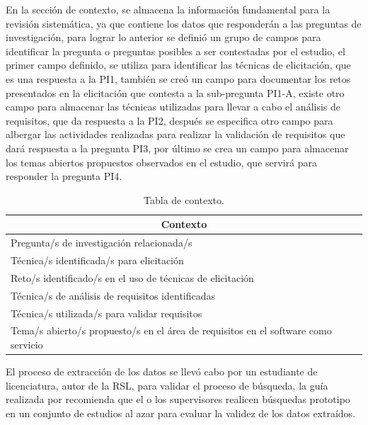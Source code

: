 \documentclass[conference,onecolumn,10pt]{IEEEtran}
\begin{document}
En la sección de contexto, se almacena la información fundamental para la revisión sistemática, ya que contiene los datos que responderán a las
preguntas de investigación, para lograr lo anterior se definió un grupo de campos para identificar la pregunta o preguntas posibles a ser contestadas 
por el estudio, el primer campo definido, se utiliza para identificar las técnicas de elicitación, que es una respuesta a la PI1, también se creó un campo para 
documentar los retos presentados en la elicitación que contesta a la sub-pregunta PI1-A, existe otro campo para almacenar las técnicas utilizadas para llevar a cabo 
el análisis de requisitos, que da respuesta a la PI2, después se especifica otro campo para albergar las actividades realizadas para realizar la validación de requisitos que 
dará respuesta a la pregunta PI3, por último se crea un campo para almacenar los temas abiertos propuestos observados en el estudio, que servirá para responder la pregunta PI4.


\begin{table}[h!]
    \begin{center}
    \caption{Tabla de contexto.}
    \label{tab:datosgenerales}
    \begin{tabular}{|l|c|}
    \hline
    \multicolumn{2}{|c|}{Contexto} \\
    \hline
    Pregunta/s de investigación relacionada/s & \\
    \hline
    Técnica/s identificada/s para elicitación& \\
    \hline
    Reto/s identificado/s en el uso de técnicas de elicitación& \\
    \hline
    Técnica/s de análisis de requisitos identificadas& \\
    \hline
    Técnica/s utilizada/s para validar requisitos & \\
    \hline
    Tema/s abierto/s propuesto/s en el área de requisitos en el software como servicio& \\
    \hline
    \end{tabular}
    \end{center}
\end{table}


El proceso de extracción de los datos se llevó cabo por un estudiante de licenciatura, autor de la RSL, para validar el proceso de búsqueda, la guía realizada por
\cite{kitchenham2007guidelines} recomienda que el o los supervisores realicen búsquedas prototipo en un conjunto de estudios al azar para evaluar la validez 
de los datos extraídos.
\newpage
\end{document}
